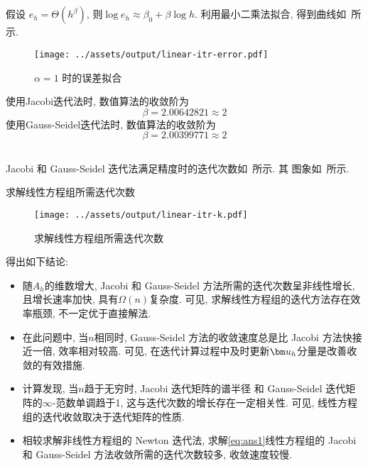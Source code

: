 \documentclass{nedsart}
\begin{document}
\subsection[第3题]{}
假设 $e_h = \Theta(h^\beta)$, 则$\log e_h \approx \beta_0 + \beta \log h$. 利用最小二乘法拟合, 得到曲线如~所示.
\begin{figure}[H]
    \centering
    \texttt{[image: ../assets/output/linear-itr-error.pdf]}
    \caption{$\alpha = 1$ 时的误差拟合}\label{fig:linear-itr-error}
\end{figure}\noindent
使用Jacobi迭代法时, 数值算法的收敛阶为
\begin{equation}
    \beta = 2.00642821 \approx 2
\end{equation}
使用Gauss-Seidel迭代法时, 数值算法的收敛阶为
\begin{equation}
    \beta = 2.00399771 \approx 2
\end{equation}

\subsection[第4题]{}

Jacobi 和 Gauss-Seidel 迭代法满足精度时的迭代次数如~所示. 其
图象如~所示.
\begin{table}[H]
    \small\centering
    \caption{求解线性方程组所需迭代次数}\label{tab:linear-itr-k}
\end{table}
\begin{figure}[H]
    \centering
    \texttt{[image: ../assets/output/linear-itr-k.pdf]}
    \caption{求解线性方程组所需迭代次数}\label{fig:linear-itr-k}
\end{figure}\noindent

得出如下结论:
\begin{itemize}[noitemsep]
    \item 随$A_h$的维数增大, Jacobi 和 Gauss-Seidel 方法所需的迭代次数呈非线性增长, 且增长速率加快, 具有$\Omega(n)$复杂度. 可见, 求解线性方程组的迭代方法存在效率瓶颈, 不一定优于直接解法.
    \item 在此问题中, 当$n$相同时, Gauss-Seidel 方法的收敛速度总是比 Jacobi 方法快接近一倍, 效率相对较高. 可见, 在迭代计算过程中及时更新$\uh$分量是改善收敛的有效措施.
    \item 计算发现, 当$n$趋于无穷时, Jacobi 迭代矩阵的谱半径 和 Gauss-Seidel 迭代矩阵的$\infty$-范数单调趋于1, 这与迭代次数的增长存在一定相关性. 可见, 线性方程组的迭代收敛取决于迭代矩阵的性质. 
    \item 相较求解非线性方程组的 Newton 迭代法, 求解\eqref{eq:ans1}线性方程组的 Jacobi 和 Gauss-Seidel 方法收敛所需的迭代次数较多, 收敛速度较慢.
\end{itemize}
\end{document}

